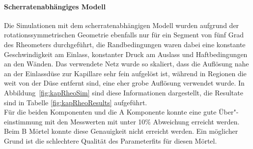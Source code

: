 \paragraph{Scherratenabhängiges Modell}
Die Simulationen mit dem scherratenabhängigen Modell wurden aufgrund der rotationssymmetrischen Geometrie ebenfalls nur für ein Segment von fünf Grad des Rheometers durchgeführt, die Randbedingungen waren dabei eine konstante Geschwindigkeit am Einlass, konstanter Druck am Auslass und Haftbedingungen an den Wänden. 
Das verwendete Netz wurde so skaliert, dass die Auflösung nahe an der Einlassdüse zur Kapillare sehr fein aufgelöst ist, während in Regionen die weit von der Düse entfernt sind, eine eher grobe Auflösung verwendet wurde. 
In Abbildung~\ref{fig:kapRheoSim} sind diese Informationen dargestellt, die Resultate sind in Tabelle \ref{fig:kapRheoResults} aufgeführt.\\
Für die beiden \moertelB{} Komponenten und die \moertelA{} A Komponente konnte eine gute Über"-einstimmung mit den Messwerten mit unter 10\% Ab\-wei\-chung erreicht werden. Beim \moertelA{} B Mörtel konnte diese Genauigkeit nicht erreicht werden. Ein möglicher Grund ist die schlechtere Qualität des Parameterfits für diesen Mörtel.
%
